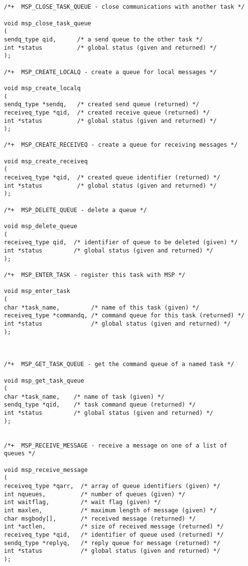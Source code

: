 \begin{verbatim}


/*+  MSP_CLOSE_TASK_QUEUE - close communications with another task */

void msp_close_task_queue
(
sendq_type qid,      /* a send queue to the other task */
int *status          /* global status (given and returned) */
);

/*+  MSP_CREATE_LOCALQ - create a queue for local messages */

void msp_create_localq
(
sendq_type *sendq,   /* created send queue (returned) */
receiveq_type *qid,  /* created receive queue (returned) */
int *status          /* global status (given and returned) */
);

/*+  MSP_CREATE_RECEIVEQ - create a queue for receiving messages */

void msp_create_receiveq
(
receiveq_type *qid,  /* created queue identifier (returned) */
int *status          /* global status (given and returned) */
);

/*+  MSP_DELETE_QUEUE - delete a queue */

void msp_delete_queue
(
receiveq_type qid,  /* identifier of queue to be deleted (given) */
int *status         /* global status (given and returned) */
);

/*+  MSP_ENTER_TASK - register this task with MSP */

void msp_enter_task
(
char *task_name,         /* name of this task (given) */
receiveq_type *commandq, /* command queue for this task (returned) */
int *status              /* global status (given and returned) */
);



/*+  MSP_GET_TASK_QUEUE - get the command queue of a named task */

void msp_get_task_queue
(
char *task_name,    /* name of task (given) */
sendq_type *qid,    /* task command queue (returned) */
int *status         /* global status (given and returned) */
);


/*+  MSP_RECEIVE_MESSAGE - receive a message on one of a list of queues */

void msp_receive_message
(
receiveq_type *qarr,  /* array of queue identifiers (given) */
int nqueues,          /* number of queues (given) */
int waitflag,         /* wait flag (given) */
int maxlen,           /* maximum length of message (given) */
char msgbody[],       /* received message (returned) */
int *actlen,          /* size of received message (returned) */
receiveq_type *qid,   /* identifier of queue used (returned) */
sendq_type *replyq,   /* reply queue for message (returned) */
int *status           /* global status (given and returned) */
);


\end{verbatim}
